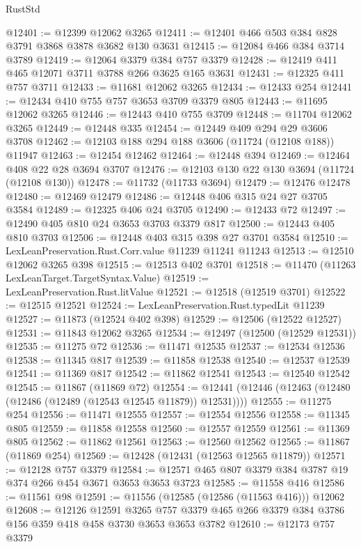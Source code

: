 \begin{lexlean}{RustStd}
\begin{coremodule}
@12401 := @12399 @12062 @3265
@12411 := @12401 @466 @503 @384 @828 @3791 @3868 @3878 @3682 @130 @3631
@12415 := @12084 @466 @384 @3714 @3789
@12419 := @12064 @3379 @384 @757 @3379
@12428 := @12419 @411 @465 @12071 @3711 @3788 @266 @3625 @165 @3631
@12431 := @12325 @411 @757 @3711
@12433 := @11681 @12062 @3265
@12434 := @12433 @254
@12441 := @12434 @410 @755 @757 @3653 @3709 @3379 @805
@12443 := @11695 @12062 @3265
@12446 := @12443 @410 @755 @3709
@12448 := @11704 @12062 @3265
@12449 := @12448 @335
@12454 := @12449 @409 @294 @29 @3606 @3708
@12462 := @12103 @188 @294 @188 @3606 (@11724 (@12108 @188)) @11947
@12463 := @12454 @12462
@12464 := @12448 @394
@12469 := @12464 @408 @22 @28 @3694 @3707
@12476 := @12103 @130 @22 @130 @3694 (@11724 (@12108 @130))
@12478 := @11732 (@11733 @3694)
@12479 := @12476 @12478
@12480 := @12469 @12479
@12486 := @12448 @406 @315 @24 @27 @3705 @3584
@12489 := @12325 @406 @24 @3705
@12490 := @12433 @72
@12497 := @12490 @405 @810 @24 @3653 @3703 @3379 @817
@12500 := @12443 @405 @810 @3703
@12506 := @12448 @403 @315 @398 @27 @3701 @3584
@12510 := LexLeanPreservation.Rust.Corr.value @11239 @11241 @11243
@12513 := @12510 @12062 @3265 @398
@12515 := @12513 @402 @3701
@12518 := @11470 (@11263 LexLeanTarget.TargetSyntax.Value)
@12519 := LexLeanPreservation.Rust.litValue
@12521 := @12518 (@12519 @3701)
@12522 := @12515 @12521
@12524 := LexLeanPreservation.Rust.typedLit @11239
@12527 := @11873 (@12524 @402 @398)
@12529 := @12506 (@12522 @12527)
@12531 := @11843 @12062 @3265
@12534 := @12497 (@12500 (@12529 @12531))
@12535 := @11275 @72
@12536 := @11471 @12535
@12537 := @12534 @12536
@12538 := @11345 @817
@12539 := @11858 @12538
@12540 := @12537 @12539
@12541 := @11369 @817
@12542 := @11862 @12541
@12543 := @12540 @12542
@12545 := @11867 (@11869 @72)
@12554 := @12441 (@12446 (@12463 (@12480 (@12486 (@12489 (@12543 @12545 @11879)) @12531))))
@12555 := @11275 @254
@12556 := @11471 @12555
@12557 := @12554 @12556
@12558 := @11345 @805
@12559 := @11858 @12558
@12560 := @12557 @12559
@12561 := @11369 @805
@12562 := @11862 @12561
@12563 := @12560 @12562
@12565 := @11867 (@11869 @254)
@12569 := @12428 (@12431 (@12563 @12565 @11879))
@12571 := @12128 @757 @3379
@12584 := @12571 @465 @807 @3379 @384 @3787 @19 @374 @266 @454 @3671 @3653 @3653 @3723
@12585 := @11558 @416
@12586 := @11561 @98
@12591 := @11556 (@12585 (@12586 (@11563 @416))) @12062
@12608 := @12126
    @12591
    @3265
    @757
    @3379
    @465
    @266
    @3379
    @384
    @3786
    @156
    @359
    @418
    @458
    @3730
    @3653
    @3653
    @3782
@12610 := @12173 @757 @3379

\end{coremodule}
\end{lexlean}
